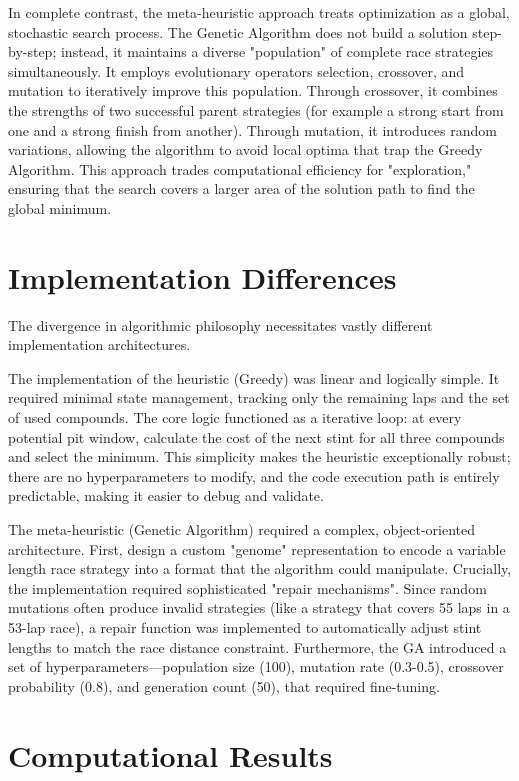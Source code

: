 \documentclass[10pt]{article}
\begin{document}
In complete contrast, the meta-heuristic approach treats optimization as a global, stochastic search process.
The Genetic Algorithm does not build a solution step-by-step; instead, it maintains a diverse "population" of complete race strategies simultaneously.
It employs evolutionary operators selection, crossover, and mutation to iteratively improve this population.
Through crossover, it combines the strengths of two successful parent strategies (for example a strong start from one and a strong finish from another). 
Through mutation, it introduces random variations, allowing the algorithm to avoid local optima that trap the Greedy Algorithm.
This approach trades computational efficiency for "exploration," ensuring that the search covers a larger area of the solution path to find the global minimum.

\section{Implementation Differences}

The divergence in algorithmic philosophy necessitates vastly different implementation architectures.

The implementation of the heuristic (Greedy) was linear and logically simple. 
It required minimal state management, tracking only the remaining laps and the set of used compounds.
The core logic functioned as a iterative loop: at every potential pit window, calculate the cost of the next stint for all three compounds and select the minimum.
This simplicity makes the heuristic exceptionally robust; there are no hyperparameters to modify, and the code execution path is entirely predictable, making it easier to debug and validate.

The meta-heuristic (Genetic Algorithm) required a complex, object-oriented architecture.
First, design a custom "genome" representation to encode a variable length race strategy into a format that the algorithm could manipulate.
Crucially, the implementation required sophisticated "repair mechanisms". 
Since random mutations often produce invalid strategies (like a strategy that covers 55 laps in a 53-lap race), a repair function was implemented to automatically adjust stint lengths to match the race distance constraint.
Furthermore, the GA introduced a set of hyperparameters—population size (100), mutation rate (0.3-0.5), crossover probability (0.8), and generation count (50), that required fine-tuning. 

\section{Computational Results}
\end{document}
